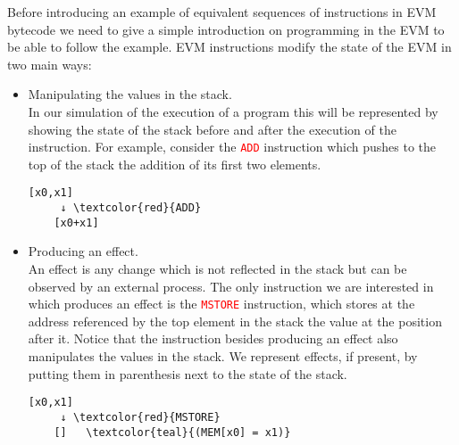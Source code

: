 
Before introducing an example of equivalent sequences of instructions in
EVM bytecode we need to give a simple introduction on programming in the
EVM to be able to follow the example. EVM instructions modify the state
of the EVM in two main ways:
\begin{itemize}
    \item Manipulating the values in the stack. \\
    In our simulation of the execution of a program this will be represented
    by showing the state of the stack before and after the execution of the 
    instruction. For example, consider the 
    \textcolor{red}{\texttt{ADD}} instruction which pushes to the top of the 
    stack the addition of its first two elements.
    \begin{Verbatim}[commandchars=\\\{\}]
    [x0,x1] 
     ↓ \textcolor{red}{ADD}
    [x0+x1]
    \end{Verbatim}

    \item Producing an effect. \\
    An effect is any change which is not reflected in the stack but can be 
    observed by an external process. The only instruction we are interested in
    which produces an effect is the \textcolor{red}{\texttt{MSTORE}} 
    instruction, which stores at the address referenced by the top element in 
    the stack the value at the position after it. Notice that the instruction
    besides producing an effect also manipulates the values in the stack. We
    represent effects, if present, by putting them in parenthesis next to the 
    state of the stack.
    \begin{Verbatim}[commandchars=\\\{\}]
    [x0,x1]
     ↓ \textcolor{red}{MSTORE}
    []   \textcolor{teal}{(MEM[x0] = x1)}
    \end{Verbatim}
\end{itemize}

